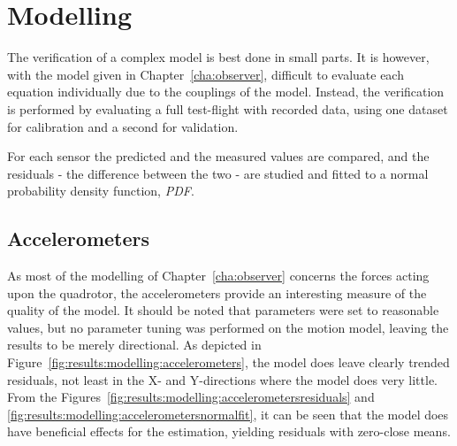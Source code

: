 \section{Modelling}
\label{sec:results:modelling}
    The verification of a complex model is best done in small parts.
    It is however, with the model given in Chapter~\ref{cha:observer},
    difficult to evaluate each equation individually due to the couplings of the model.
    Instead, the verification is performed by evaluating a full test-flight
    with recorded data, using one dataset for calibration and a second for validation.

    For each sensor the predicted and the measured values are compared,
    and the residuals - the difference between the two - are studied and
    fitted to a normal probability density function, \textit{PDF}.

    \subsection{Accelerometers}
        \label{ssec:results:modelling:accelerometers}
        As most of the modelling of Chapter~\ref{cha:observer} concerns
        the forces acting upon the quadrotor, the accelerometers
        provide an interesting measure of the quality of the model.
        It should be noted that parameters were set to reasonable values,
        but no parameter tuning was performed on the motion model,
        leaving the results to be merely directional.
        As depicted in Figure~\ref{fig:results:modelling:accelerometers},
        the model does leave clearly trended residuals, not least in the
        X- and Y-directions where the model does very little.
        From the Figures~\ref{fig:results:modelling:accelerometersresiduals} and \ref{fig:results:modelling:accelerometersnormalfit},
        it can be seen that the model does have beneficial
        effects for the estimation, yielding residuals with zero-close means.

